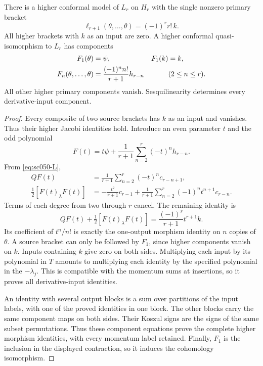 \begin{theorem}\label{thm:sc050-first-operation}
There is a higher conformal model of \(L_r\) on \(H_r\) with the
single nonzero primary bracket
\begin{equation}\label{eq:sc050-ell}
 \ell_{r+1}(\theta,\ldots,\theta)=(-1)^r r!\,k.
\end{equation}
All higher brackets with \(k\) as an input are zero.
A higher conformal quasi-isomorphism to \(L_r\) has components
\begin{align}
 F_1(\theta)&=\psi,&F_1(k)&=k,\notag\\
 F_n(\theta,\ldots,\theta)
   &=\frac{(-1)^n n!}{r+1}h_{r-n}
       &&(2\le n\le r).
 \label{eq:sc050-F}
\end{align}
All other higher primary components vanish. Sesquilinearity determines
every derivative-input component.
\end{theorem}
\begin{proof}
Every composite of two source brackets has \(k\) as an input and
vanishes. Thus their higher Jacobi identities hold. Introduce an
even parameter \(t\) and the odd polynomial
\[
 F(t)=t\psi+\frac1{r+1}\sum_{n=2}^r(-t)^n h_{r-n}.
\]
From \eqref{eq:sc050-L},
\begin{align*}
 QF(t)&=\frac1{r+1}\sum_{n=2}^r(-t)^n c_{r-n+1},\\
 \frac12[F(t)_\lambda F(t)]
   &=-\frac{t^2}{r+1}c_{r-1}
     +\frac1{r+1}\sum_{n=2}^r(-1)^nt^{n+1}c_{r-n}.
\end{align*}
Terms of each degree from two through \(r\) cancel. The remaining
identity is
\begin{equation}\label{eq:sc050-LMC}
 QF(t)+\tfrac12[F(t)_\lambda F(t)]
      =\frac{(-1)^r}{r+1}t^{r+1}k.
\end{equation}
Its coefficient of \(t^n/n!\) is exactly the one-output morphism
identity on \(n\) copies of \(\theta\). A source bracket can only
be followed by \(F_1\), since higher components vanish on \(k\).
Inputs containing \(k\) give zero on both sides. Multiplying each
input by its polynomial in \(T\) amounts to multiplying each
identity by the specified polynomial in the \(-\lambda_j\).
This is compatible with the momentum sums at insertions, so it
proves all derivative-input identities.

An identity with several output blocks is a sum over partitions
of the input labels, with one of the proved identities in one
block. The other blocks carry the same component maps on both
sides. Their Koszul signs are the signs of the same subset
permutations. Thus these component equations prove the complete
higher morphism identities, with every momentum label retained.
Finally, \(F_1\) is the inclusion in the displayed contraction,
so it induces the cohomology isomorphism.
\end{proof}

